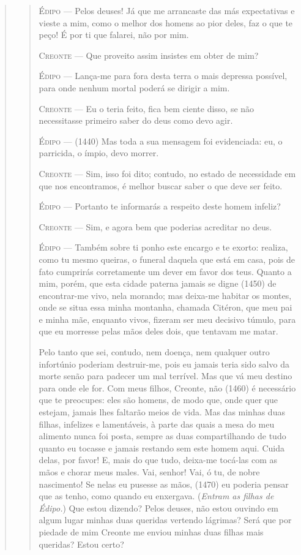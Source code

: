 \begin{verse}
\begin{verse}
\textsc{Édipo} --- Pelos deuses! Já que me arrancaste das más expectativas e vieste a mim,
como o melhor dos homens ao pior deles, faz o que te peço! É por ti que
falarei, não por mim.

\textsc{Creonte} --- Que proveito assim insistes em obter de mim?

\textsc{Édipo} --- Lança-me para fora desta terra o mais depressa possível, para onde
nenhum mortal poderá se dirigir a mim.

\textsc{Creonte} --- Eu o teria feito, fica bem ciente disso, se não necessitasse primeiro
saber do deus como devo agir.

\textsc{Édipo} --- (1440) Mas toda a sua mensagem foi evidenciada: eu, o parricida, o
ímpio, devo morrer.

\textsc{Creonte} --- Sim, isso foi dito; contudo, no estado de necessidade em que nos
encontramos, é melhor buscar saber o que deve ser feito.

\textsc{Édipo} --- Portanto te informarás a respeito deste homem infeliz?

\textsc{Creonte} --- Sim, e agora bem que poderias acreditar no deus.

\textsc{Édipo} --- Também sobre ti ponho este encargo e te exorto: realiza, como tu mesmo
queiras, o funeral daquela que está em casa, pois de fato cumprirás
corretamente um dever em favor dos teus. Quanto a mim, porém, que esta
cidade paterna jamais se digne (1450) de encontrar-me vivo, nela
morando; mas deixa-me habitar os montes, onde se situa essa minha
montanha, chamada Citéron, que meu pai e minha mãe, enquanto vivos,
fizeram ser meu decisivo túmulo, para que eu morresse pelas mãos deles
dois, que tentavam me matar.

Pelo tanto que sei, contudo, nem doença, nem qualquer outro infortúnio
poderiam destruir-me, pois eu jamais teria sido salvo da morte senão
para padecer um mal terrível. Mas que vá meu destino para onde ele for.
Com meus filhos, Creonte, não (1460) é necessário que te preocupes: eles
são homens, de modo que, onde quer que estejam, jamais lhes faltarão
meios de vida. Mas das minhas duas filhas, infelizes e lamentáveis, à
parte das quais a mesa do meu alimento nunca foi posta, sempre as duas
compartilhando de tudo quanto eu tocasse e jamais restando sem este
homem aqui. Cuida delas, por favor! E, mais do que tudo, deixa-me
tocá-las com as mãos e chorar meus males. Vai, senhor! Vai, ó tu, de
nobre nascimento! Se nelas eu pusesse as mãos, (1470) eu poderia pensar
que as tenho, como quando eu enxergava. (\emph{Entram as filhas de
Édipo.}) Que estou dizendo? Pelos deuses, não estou ouvindo em algum
lugar minhas duas queridas vertendo lágrimas? Será que por piedade de
mim Creonte me enviou minhas duas filhas mais queridas? Estou certo?


\end{verse}
\end{verse}
